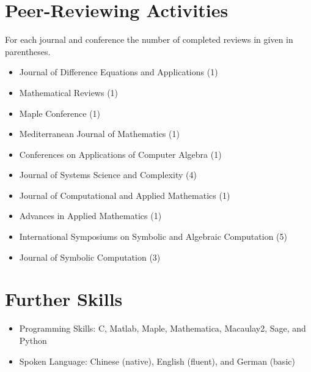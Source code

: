 \documentclass[a4paper,12pt]{article}
\begin{document}
\section*{\Large Peer-Reviewing Activities}
For each journal and conference the number of completed reviews in given in parentheses.
\begin{itemize}
\item Journal of Difference Equations and Applications (1)
\item Mathematical Reviews (1)
\item Maple Conference (1)
\item Mediterranean Journal of Mathematics (1)
\item Conferences on Applications of Computer Algebra (1)
 \item Journal of Systems Science and Complexity (4)
 \item Journal of Computational and Applied Mathematics (1)
 \item Advances in Applied Mathematics (1)
 \item International Symposiums on Symbolic and Algebraic Computation (5)
 \item Journal of Symbolic Computation (3)
\end{itemize}

\section*{\Large{Further Skills}}
\begin{itemize}
 \item Programming Skills: C, Matlab, Maple, Mathematica, Macaulay2, Sage, and Python
 \item Spoken Language: Chinese (native), English (fluent), and German (basic)
\end{itemize}

\end{document}
